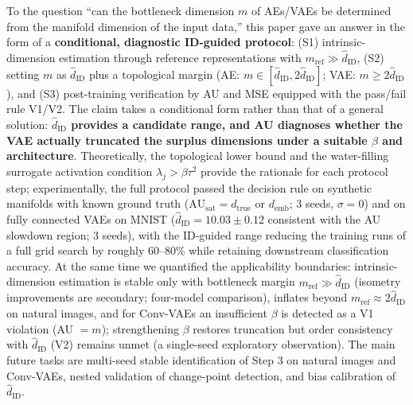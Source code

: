 \documentclass[make,article,submit,pdftex,moreauthors]{Definitions/mdpi}
\newcommand{\hatdID}{\hat{d}_{\mathrm{ID}}}
\newcommand{\dtrue}{d_{\mathrm{true}}}
\newcommand{\AUsat}{\mathrm{AU}_{\mathrm{sat}}}
\newcommand{\demb}{d_{\mathrm{emb}}}
\begin{document}
To the question ``can the bottleneck dimension $m$ of AEs/VAEs be determined
from the manifold dimension of the input data,'' this paper gave an answer
in the form of a \textbf{conditional, diagnostic ID-guided protocol}:
(S1) intrinsic-dimension estimation through reference representations with
$m_{\mathrm{ref}} \gg \hatdID$,
(S2) setting $m$ as $\hatdID$ plus a topological margin
(AE: $m \in [\hatdID, 2\hatdID]$; VAE: $m \geq 2\hatdID$), and
(S3) post-training verification by AU and MSE equipped with the pass/fail
rule V1/V2.
The claim takes a conditional form rather than that of a general solution:
\textbf{$\hatdID$ provides a candidate range, and AU diagnoses whether the
VAE actually truncated the surplus dimensions under a suitable $\beta$ and
architecture}.
Theoretically, the topological lower bound and the water-filling surrogate
activation condition $\lambda_j > \beta\tau^2$ provide the rationale for
each protocol step;
experimentally, the full protocol passed the decision rule on synthetic
manifolds with known ground truth ($\AUsat = \dtrue$ or $\demb$; 3 seeds,
$\sigma = 0$) and on fully connected VAEs on MNIST
($\hatdID = 10.03 \pm 0.12$ consistent with the AU slowdown region;
3 seeds), with the ID-guided range reducing the training runs of a full
grid search by roughly 60--80\% while retaining downstream classification
accuracy.
At the same time we quantified the applicability boundaries:
intrinsic-dimension estimation is stable only with bottleneck margin
$m_{\mathrm{ref}} \gg \hatdID$ (isometry improvements are secondary;
four-model comparison), inflates beyond
$m_{\mathrm{ref}} \approx 2\hatdID$ on natural images, and for Conv-VAEs an
insufficient $\beta$ is detected as a V1 violation (AU $= m$); strengthening
$\beta$ restores truncation but order consistency with $\hatdID$ (V2)
remains unmet (a single-seed exploratory observation).
The main future tasks are multi-seed stable identification of Step 3 on
natural images and Conv-VAEs, nested validation of change-point detection,
and bias calibration of $\hatdID$.


\end{document}
